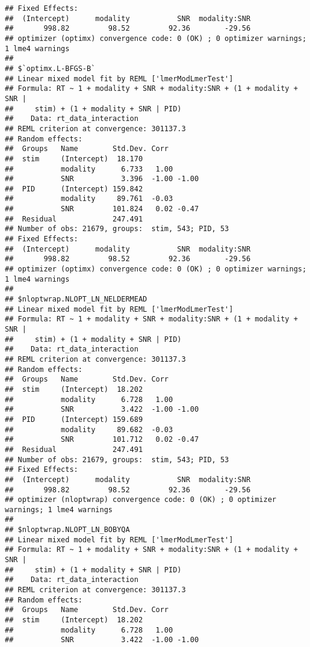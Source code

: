 \documentclass[
]{article}
\begin{document}
\begin{verbatim}
## Fixed Effects:
##  (Intercept)      modality           SNR  modality:SNR  
##       998.82         98.52         92.36        -29.56  
## optimizer (optimx) convergence code: 0 (OK) ; 0 optimizer warnings; 1 lme4 warnings 
## 
## $`optimx.L-BFGS-B`
## Linear mixed model fit by REML ['lmerModLmerTest']
## Formula: RT ~ 1 + modality + SNR + modality:SNR + (1 + modality + SNR |  
##     stim) + (1 + modality + SNR | PID)
##    Data: rt_data_interaction
## REML criterion at convergence: 301137.3
## Random effects:
##  Groups   Name        Std.Dev. Corr       
##  stim     (Intercept)  18.170             
##           modality      6.733   1.00      
##           SNR           3.396  -1.00 -1.00
##  PID      (Intercept) 159.842             
##           modality     89.761  -0.03      
##           SNR         101.824   0.02 -0.47
##  Residual             247.491             
## Number of obs: 21679, groups:  stim, 543; PID, 53
## Fixed Effects:
##  (Intercept)      modality           SNR  modality:SNR  
##       998.82         98.52         92.36        -29.56  
## optimizer (optimx) convergence code: 0 (OK) ; 0 optimizer warnings; 1 lme4 warnings 
## 
## $nloptwrap.NLOPT_LN_NELDERMEAD
## Linear mixed model fit by REML ['lmerModLmerTest']
## Formula: RT ~ 1 + modality + SNR + modality:SNR + (1 + modality + SNR |  
##     stim) + (1 + modality + SNR | PID)
##    Data: rt_data_interaction
## REML criterion at convergence: 301137.3
## Random effects:
##  Groups   Name        Std.Dev. Corr       
##  stim     (Intercept)  18.202             
##           modality      6.728   1.00      
##           SNR           3.422  -1.00 -1.00
##  PID      (Intercept) 159.689             
##           modality     89.682  -0.03      
##           SNR         101.712   0.02 -0.47
##  Residual             247.491             
## Number of obs: 21679, groups:  stim, 543; PID, 53
## Fixed Effects:
##  (Intercept)      modality           SNR  modality:SNR  
##       998.82         98.52         92.36        -29.56  
## optimizer (nloptwrap) convergence code: 0 (OK) ; 0 optimizer warnings; 1 lme4 warnings 
## 
## $nloptwrap.NLOPT_LN_BOBYQA
## Linear mixed model fit by REML ['lmerModLmerTest']
## Formula: RT ~ 1 + modality + SNR + modality:SNR + (1 + modality + SNR |  
##     stim) + (1 + modality + SNR | PID)
##    Data: rt_data_interaction
## REML criterion at convergence: 301137.3
## Random effects:
##  Groups   Name        Std.Dev. Corr       
##  stim     (Intercept)  18.202             
##           modality      6.728   1.00      
##           SNR           3.422  -1.00 -1.00

\end{verbatim}
\end{document}
